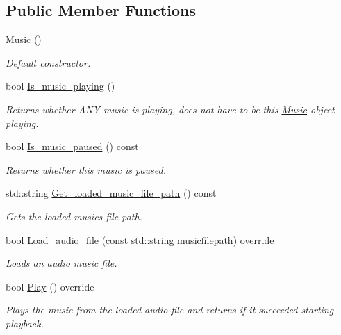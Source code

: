 \subsection*{Public Member Functions}
\begin{DoxyCompactItemize}
\item 
\hyperlink{classjetfuel_1_1media_1_1Music_aa3adce621c89ea9915bd6d13648ac5de}{Music} ()
\begin{DoxyCompactList}\small\item\em Default constructor. \end{DoxyCompactList}\item 
bool \hyperlink{classjetfuel_1_1media_1_1Music_ad19f7983782f39f70e354796c2ba0bd1}{Is\+\_\+music\+\_\+playing} ()
\begin{DoxyCompactList}\small\item\em Returns whether A\+NY music is playing, does not have to be this \hyperlink{classjetfuel_1_1media_1_1Music}{Music} object playing. \end{DoxyCompactList}\item 
bool \hyperlink{classjetfuel_1_1media_1_1Music_a7ed42b22f467dbcdd8d09da9cff5b034}{Is\+\_\+music\+\_\+paused} () const
\begin{DoxyCompactList}\small\item\em Returns whether this music is paused. \end{DoxyCompactList}\item 
std\+::string \hyperlink{classjetfuel_1_1media_1_1Music_a157b382df9640e2df504de9ed1beb031}{Get\+\_\+loaded\+\_\+music\+\_\+file\+\_\+path} () const
\begin{DoxyCompactList}\small\item\em Gets the loaded music\textquotesingle{}s file path. \end{DoxyCompactList}\item 
bool \hyperlink{classjetfuel_1_1media_1_1Music_ae24079b0301f5cf845d094e32ed22da1}{Load\+\_\+audio\+\_\+file} (const std\+::string musicfilepath) override
\begin{DoxyCompactList}\small\item\em Loads an audio music file. \end{DoxyCompactList}\item 
bool \hyperlink{classjetfuel_1_1media_1_1Music_afe9abee662a68ea9391e94e37c79945e}{Play} () override
\begin{DoxyCompactList}\small\item\em Plays the music from the loaded audio file and returns if it succeeded starting playback. \end{DoxyCompactList}\item 

\end{DoxyCompactItemize}
